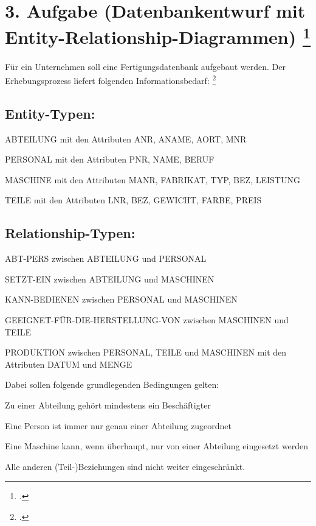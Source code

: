 \documentclass{lehramt-informatik-aufgabe}
\begin{document}
\section{3. Aufgabe (Datenbankentwurf mit Entity-Relationship-Diagrammen)
\footcite[Aufgabe 3]{examen:66111:1997:09}}

Für ein Unternehmen soll eine Fertigungsdatenbank aufgebaut werden. Der
Erhebungsprozess liefert folgenden Informationsbedarf:
\footcite[Aufgabe 4]{db:ab:7}

\subsection{Entity-Typen:}

\begin{compactitem}
\item ABTEILUNG mit den Attributen ANR, ANAME, AORT, MNR
\item PERSONAL mit den Attributen PNR, NAME, BERUF
\item MASCHINE mit den Attributen MANR, FABRIKAT, TYP, BEZ, LEISTUNG
\item TEILE mit den Attributen LNR, BEZ, GEWICHT, FARBE, PREIS
\end{compactitem}

\subsection{Relationship-Typen:}

\begin{compactitem}
\item ABT-PERS zwischen ABTEILUNG und PERSONAL
\item SETZT-EIN zwischen ABTEILUNG und MASCHINEN
\item KANN-BEDIENEN zwischen PERSONAL und MASCHINEN
\item GEEIGNET-FÜR-DIE-HERSTELLUNG-VON zwischen MASCHINEN und TEILE
\item PRODUKTION zwischen PERSONAL, TEILE und MASCHINEN mit den Attributen
DATUM und MENGE
\end{compactitem}

Dabei sollen folgende grundlegenden Bedingungen gelten:

\begin{compactitem}
\item Zu einer Abteilung gehört mindestens ein Beschäftigter

\item Eine Person ist immer nur genau einer Abteilung zugeordnet

\item Eine Maschine kann, wenn überhaupt, nur von einer Abteilung
eingesetzt werden

\item Alle anderen (Teil-)Beziehungen sind nicht weiter eingeschränkt.
\end{compactitem}
\end{document}
